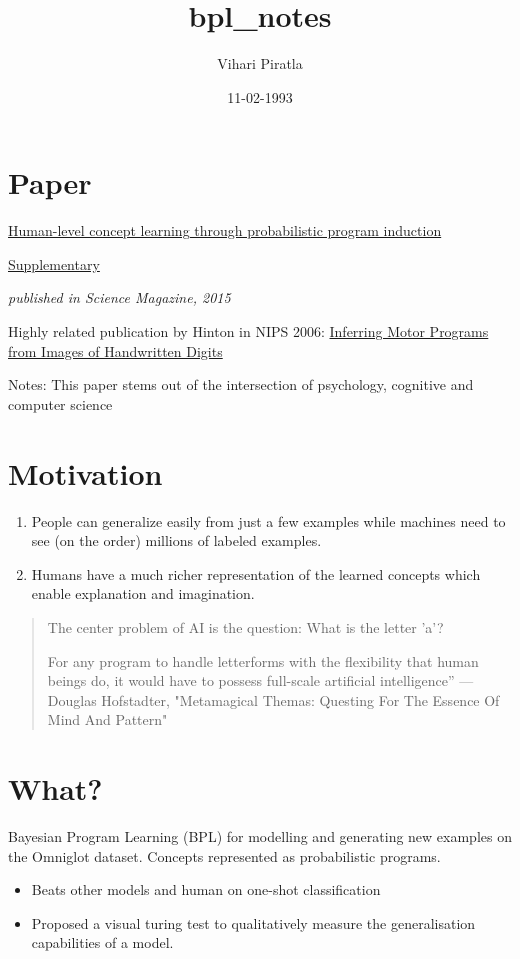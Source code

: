 \documentclass[11pt]{article}
\author{Vihari Piratla}
\date{11-02-1993}
\title{bpl\_notes}
\begin{document}
\maketitle
\tableofcontents


\section{Paper}
\label{sec-1}
\href{http://web.mit.edu/cocosci/Papers/Science-2015-Lake-1332-8.pdf}{Human-level concept learning through probabilistic program induction}

\href{https://cims.nyu.edu/~brenden/LakeEtAl2015Science_supp.pdf}{Supplementary}

\emph{published in Science Magazine, 2015}

Highly related publication by Hinton in NIPS 2006: \href{http://www.cs.toronto.edu/~hinton/absps/vnips.pdf}{Inferring Motor Programs from Images of Handwritten Digits}

Notes: This paper stems out of the intersection of psychology, cognitive and computer science

\section{Motivation}
\label{sec-2}
\begin{enumerate}
\item People can generalize easily from just a few examples while machines need to see (on the order) millions of labeled examples.
\item Humans have a much richer representation of the learned concepts which enable explanation and imagination.
\end{enumerate}

\begin{quote}
The center problem of AI is the question: What is the letter 'a'?

For any program to handle letterforms with the flexibility that human beings do, it would have to possess full-scale artificial intelligence”
--- Douglas Hofstadter, "Metamagical Themas: Questing For The Essence Of Mind And Pattern"
\end{quote}


\section{What?}
\label{sec-3}
Bayesian Program Learning (BPL) for modelling and generating new examples on the Omniglot dataset.
Concepts represented as probabilistic programs.
\begin{itemize}
\item Beats other models and human on one-shot classification
\item Proposed a visual turing test to qualitatively measure the generalisation capabilities of a model.
\end{itemize}
\end{document}
